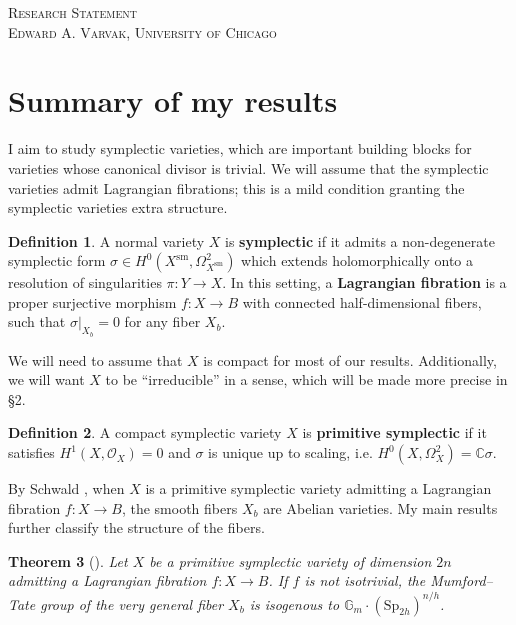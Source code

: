 \documentclass[12pt]{amsart}
\newcommand{\C}{\mathbb{C}}
\newcommand{\Sp}{\mathrm{Sp}}
\newtheorem{theorem}{Theorem}[section]
\theoremstyle{definition}
\newtheorem{definition}[theorem]{Definition}
\numberwithin{equation}{section}
\begin{document}

\begin{center}
  {\large\textsc{Research Statement}}\\[5pt]
  \small\textsc{Edward A. Varvak, University of Chicago}
\end{center}

\section{Summary of my results}

I aim to study symplectic varieties, which are important building blocks for varieties 
whose canonical divisor is trivial. We will assume that the symplectic varieties 
admit Lagrangian fibrations; this is a mild condition granting the 
symplectic varieties extra structure.

\begin{definition} A normal variety \(X\) is {\bf symplectic} if it admits a non-degenerate 
        symplectic form \(\sigma \in H^0(X^\mathrm{sm}, \Omega_{X^\mathrm{sm}}^2)\) which 
        extends holomorphically onto a resolution of singularities \(\pi: Y \to X\).
        In this setting, a {\bf Lagrangian fibration} is a proper surjective morphism 
        \(f: X \to B\) with connected half-dimensional fibers, such that 
        \(\sigma|_{X_b} = 0\) for any fiber \(X_b\).
\end{definition}

We will need to assume that \(X\) is compact for most of our results. Additionally, 
we will want \(X\) to be ``irreducible'' in a sense, which will be made more precise 
in \S 2. 

\begin{definition}
    A compact symplectic variety \(X\) is {\bf primitive symplectic} if it satisfies 
    \(H^1(X, \mathcal{O}_X) = 0\) and \(\sigma\) is unique up to scaling, i.e. 
    \(H^0(X, \Omega_X^2) = \C \sigma\).
\end{definition}

By Schwald \cite{schwald20}, when \(X\) is a primitive symplectic variety admitting 
a Lagrangian fibration \(f: X \to B\), the smooth fibers \(X_b\) are Abelian varieties. 
My main results further classify the structure of the fibers.

\begin{theorem}[\cite{varvak26}] \label{mt-classification}
    Let \(X\) be a primitive symplectic variety of dimension \(2n\) admitting a 
    Lagrangian fibration \(f: X \to B\). If \(f\) is not isotrivial, the Mumford--Tate 
    group of the very general fiber \(X_b\) is isogenous to 
    \(\mathbb{G}_m \cdot (\Sp_{2h})^{n/h}\).
\end{theorem}
\end{document}
